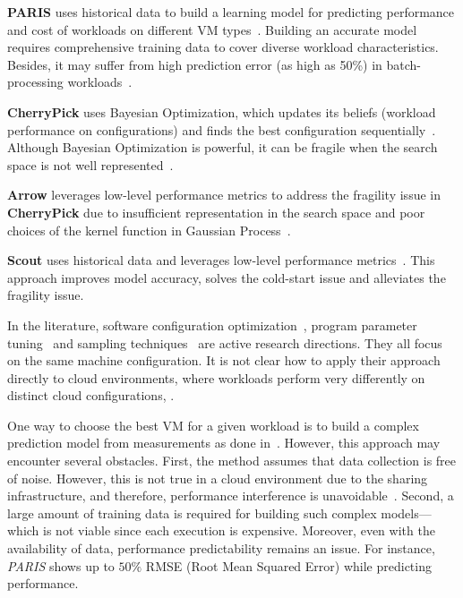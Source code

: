 \textbf{PARIS} uses historical data to build a learning model for predicting performance and cost of workloads on different VM types~\cite{Yadwadkar2017}.
Building an accurate model requires comprehensive training data to cover diverse workload characteristics.
Besides, it may suffer from high prediction error (as high as 50\%) in batch-processing workloads~\cite{Yadwadkar2017}. 

\textbf{CherryPick} uses Bayesian Optimization, which updates its beliefs (workload performance on configurations) and finds the best configuration sequentially~\cite{Alipourfard2017}.
Although Bayesian Optimization is powerful, it can be fragile when the search space is not well represented~\cite{Hsu2018Arrow}.


\textbf{Arrow} leverages low-level performance metrics to address the fragility issue in \textbf{CherryPick} due to insufficient representation in the search space and poor choices of the kernel function in Gaussian Process~\cite{Hsu2018Arrow}.

\textbf{Scout} uses historical data and leverages low-level performance metrics~\cite{Hsu2018Scout}.
This approach improves model accuracy, solves the cold-start issue and alleviates the fragility issue.


In the literature, software configuration optimization~\cite{herodotou2011starfish,zhu2017bestconfig,bilal2017towards,Dalibard2017}, program parameter tuning~\cite{Klein2017,golovin2017google} and sampling techniques~\cite{oh2017finding, nair2017} are active research directions.
They all focus on the same machine configuration.
It is not clear how to apply their approach directly to cloud environments, where
workloads perform very differently on distinct cloud configurations, .


One way to choose the best VM for a given workload is to build a complex prediction model from measurements as done in~\cite{Yadwadkar2017}.
However, this approach may encounter several obstacles.
First, the method assumes that data collection is free of noise.
However, this is not true in a cloud environment due to the sharing infrastructure, and therefore,
performance interference is unavoidable~\cite{Novakovic2013}. Second, a large amount of training data is required for building such complex models---which is not viable since each execution is expensive.
Moreover, even with the availability of data, performance predictability remains an issue.
For instance, \emph{PARIS} shows up to $50\%$ RMSE (Root Mean Squared Error) while predicting performance. 





